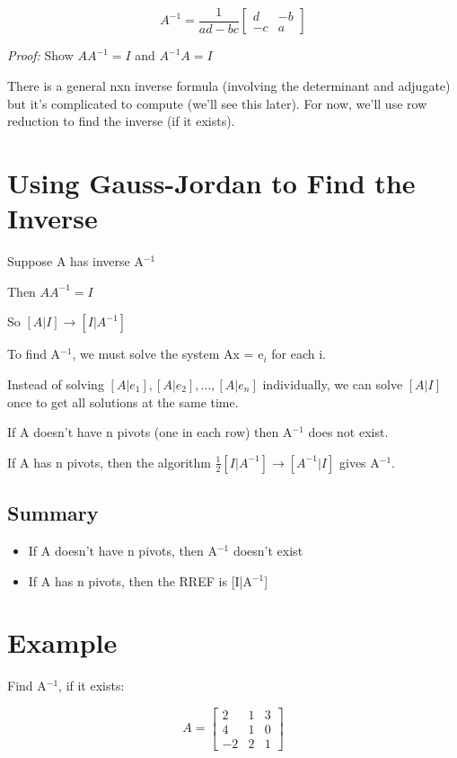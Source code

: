 \documentclass[12pt,a4paper]{article}
\begin{document}
\[A^{-1} = \frac{1}{ad-bc} \begin{bmatrix} d & -b \\ -c & a \end{bmatrix}\]

\textit{Proof:} Show $AA^{-1} = I$ and $A^{-1}A = I$

There is a general nxn inverse formula (involving the determinant and adjugate) but it's complicated to compute (we'll see this later). For now, we'll use row reduction to find the inverse (if it exists).

\section{Using Gauss-Jordan to Find the Inverse}

Suppose A has inverse A$^{-1}$

Then $AA^{-1} = I$

So $[A|I] \rightarrow [I|A^{-1}]$

To find A$^{-1}$, we must solve the system Ax = e$_i$ for each i.

Instead of solving $[A|e_1], [A|e_2], \ldots, [A|e_n]$ individually, we can solve $[A|I]$ once to get all solutions at the same time.

If A doesn't have n pivots (one in each row) then A$^{-1}$ does not exist.

If A has n pivots, then the algorithm $\frac{1}{2}[I|A^{-1}] \rightarrow [A^{-1}|I]$ gives A$^{-1}$.

\subsection{Summary}

\begin{itemize}
    \item If A doesn't have n pivots, then A$^{-1}$ doesn't exist
    \item If A has n pivots, then the RREF is [I|A$^{-1}$]
\end{itemize}

\section{Example}

Find A$^{-1}$, if it exists:

\[A = \begin{bmatrix} 2 & 1 & 3 \\ 4 & 1 & 0 \\ -2 & 2 & 1 \end{bmatrix}\]
\end{document}
